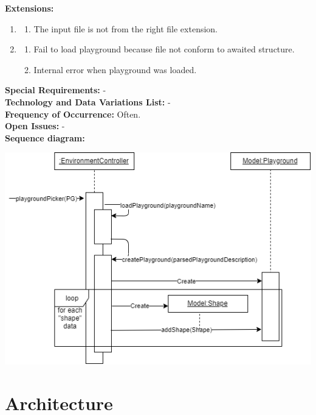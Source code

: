 \documentclass{scrbook}
\begin{document}
\textbf{Extensions: }
\begin{enumerate}\addtocounter{enumi}{1}
  \item 
  \begin{enumerate}
    \item The input file is not from the right file extension. 
  \end{enumerate}
  \item 
  \begin{enumerate}
    \item Fail to load playground because file not conform to awaited structure.
    \item Internal error when playground was loaded.
  \end{enumerate}
\end{enumerate}
\textbf{Special Requirements: }- \\
\textbf{Technology and Data Variations List: }- \\
\textbf{Frequency of Occurrence: }Often. \\
\textbf{Open Issues: }- \\
\textbf{Sequence diagram: } \\
\begin{center}
  \includegraphics[scale=0.7]{./loadPlayground_sd}
\end{center}



\chapter{Architecture}
\end{document}
